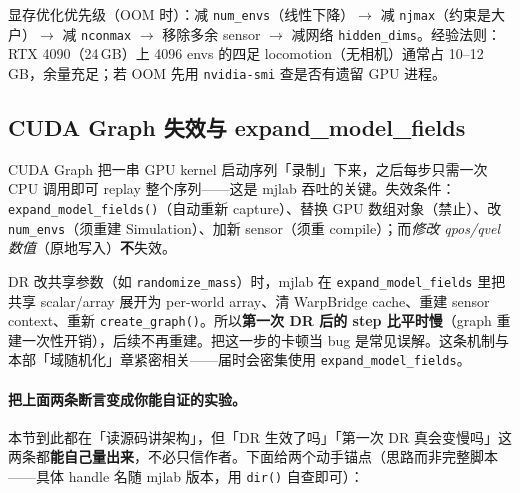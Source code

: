 显存优化优先级（OOM 时）：减 \verb|num_envs|（线性下降）$\to$ 减 \verb|njmax|（约束是大户）$\to$ 减 \verb|nconmax| $\to$ 移除多余 sensor $\to$ 减网络 \verb|hidden_dims|。经验法则：RTX 4090（24\,GB）上 4096 envs 的四足 locomotion（无相机）通常占 10--12\,GB，余量充足；若 OOM 先用 \verb|nvidia-smi| 查是否有遗留 GPU 进程。

\subsection{CUDA Graph 失效与 expand\_model\_fields}

CUDA Graph 把一串 GPU kernel 启动序列「录制」下来，之后每步只需一次 CPU 调用即可 replay 整个序列——这是 mjlab 吞吐的关键。失效条件：\verb|expand_model_fields()|（自动重新 capture）、替换 GPU 数组对象（禁止）、改 \verb|num_envs|（须重建 Simulation）、加新 sensor（须重 compile）；而\emph{修改 qpos/qvel 数值}（原地写入）\textbf{不}失效。

\begin{note}
DR 改共享参数（如 \verb|randomize_mass|）时，mjlab 在 \verb|expand_model_fields| 里把共享 scalar/array 展开为 per-world array、清 WarpBridge cache、重建 sensor context、重新 \verb|create_graph()|。所以\textbf{第一次 DR 后的 step 比平时慢}（graph 重建一次性开销），后续不再重建。把这一步的卡顿当 bug 是常见误解。这条机制与本部「域随机化」章紧密相关——届时会密集使用 \verb|expand_model_fields|。
\end{note}

\paragraph{把上面两条断言变成你能自证的实验。}本节到此都在「读源码讲架构」，但「DR 生效了吗」「第一次 DR 真会变慢吗」这两条都\textbf{能自己量出来}，不必只信作者。下面给两个动手锚点（思路而非完整脚本——具体 handle 名随 mjlab 版本，用 \verb|dir()| 自查即可）：

